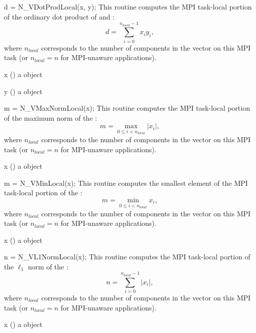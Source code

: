 {
  d = N\_VDotProdLocal(x, y);
}
{
  This routine computes the MPI task-local portion of the ordinary dot product of  and :
  \begin{equation*}
    d=\sum_{i=0}^{n_{local}-1} x_i y_i,
  \end{equation*}
  where $n_{local}$ corresponds
  to the number of components in the vector on this MPI task (or
  $n_{local}=n$ for MPI-unaware applications).
}
{
  \begin{args}[x]
  \item[x] () a {\nvector} object
  \item[y] () a {\nvector} object
  \end{args}
}
{
}
{}

{
  m = N\_VMaxNormLocal(x);
}
{
  This routine computes the MPI task-local portion of the maximum norm of the  :
  \begin{equation*}
    m = \max_{0\le i< n_{local}} | x_i |,
  \end{equation*}
  where $n_{local}$ corresponds
  to the number of components in the vector on this MPI task (or
  $n_{local}=n$ for MPI-unaware applications).
}
{
  \begin{args}[x]
  \item[x] () a {\nvector} object
  \end{args}
}
{
}
{}

{
  m = N\_VMinLocal(x);
}
{
  This routine computes the smallest element of the MPI task-local portion of
  the  :
  \begin{equation*}
    m = \min_{0\le i< n_{local}} x_i,
  \end{equation*}
  where $n_{local}$ corresponds
  to the number of components in the vector on this MPI task (or
  $n_{local}=n$ for MPI-unaware applications).
}
{
  \begin{args}[x]
  \item[x] () a {\nvector} object
  \end{args}
}
{
}
{}

{
  n = N\_VL1NormLocal(x);
}
{
  This routine computes the MPI task-local portion of the $\ell_1$ norm of the  :
  \begin{equation*}
  n = \sum_{i=0}^{n_{local}-1} | x_i |,
  \end{equation*}
  where $n_{local}$ corresponds
  to the number of components in the vector on this MPI task (or
  $n_{local}=n$ for MPI-unaware applications).
}
{
  \begin{args}[x]
  \item[x] () a {\nvector} object
  \end{args}
}
{
}
{}

